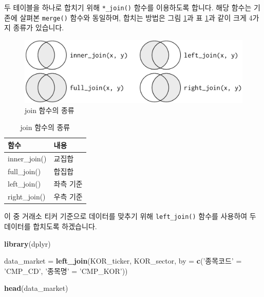 \documentclass[12pt,]{book}
\newenvironment{Shaded}{\begin{snugshade}}{\end{snugshade}}
\newcommand{\DataTypeTok}[1]{\textcolor[rgb]{0.13,0.29,0.53}{#1}}
\newcommand{\KeywordTok}[1]{\textcolor[rgb]{0.13,0.29,0.53}{\textbf{#1}}}
\newcommand{\NormalTok}[1]{#1}
\newcommand{\StringTok}[1]{\textcolor[rgb]{0.31,0.60,0.02}{#1}}
\begin{document}
두 테이블을 하나로 합치기 위해 \texttt{*\_join()} 함수를 이용하도록 합니다. 해당 함수는 기존에 살펴본 \texttt{merge()} 함수와 동일하며, 합치는 방법은 그림 \ref{fig:joinimg}과 표 \ref{tab:joindesc}과 같이 크게 4가지 종류가 있습니다.

\begin{figure}[h]

{\centering \includegraphics[width=0.7\linewidth]{images/data_analysis_join} 

}

\caption{join 함수의 종류}\label{fig:joinimg}
\end{figure}

\begin{table}[!h]

\caption{\label{tab:joindesc}join 함수의 종류}
\centering
\begin{tabular}{>{\centering\arraybackslash}p{4cm}>{\centering\arraybackslash}p{4cm}}
\toprule
함수 & 내용\\
\midrule
\rowcolor{gray!6}  inner\_join() & 교집합\\
full\_join() & 합집합\\
\rowcolor{gray!6}  left\_join() & 좌측 기준\\
right\_join() & 우측 기준\\
\bottomrule
\end{tabular}
\end{table}

이 중 거래소 티커 기준으로 데이터를 맞추기 위해 \texttt{left\_join()} 함수를 사용하여 두 데이터를 합치도록 하겠습니다.

\begin{Shaded}
\begin{Highlighting}[]
\KeywordTok{library}\NormalTok{(dplyr)}

\NormalTok{data_market =}\StringTok{ }\KeywordTok{left_join}\NormalTok{(KOR_ticker, KOR_sector,}
                         \DataTypeTok{by =} \KeywordTok{c}\NormalTok{(}\StringTok{'종목코드'}\NormalTok{ =}\StringTok{ 'CMP_CD'}\NormalTok{,}
                                \StringTok{'종목명'}\NormalTok{ =}\StringTok{ 'CMP_KOR'}\NormalTok{))}

\KeywordTok{head}\NormalTok{(data_market)}
\end{Highlighting}
\end{Shaded}
\end{document}
